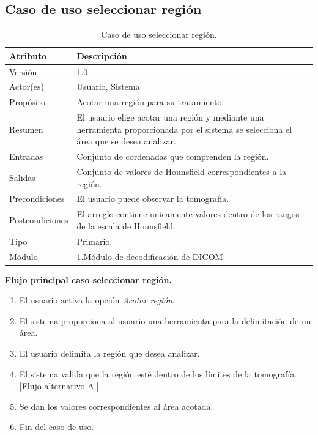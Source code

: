 \documentclass[12pt]{report}
\begin{document}
\subsection{Caso de uso seleccionar región}
\begin{table}[H]
\begin{center}
\begin{tabular}{p{30mm}p{80mm}}
\hline
Atributo & Descripción\\
\hline \hline 
Versión & 1.0\\
Actor(es) & Usuario, Sistema\\
Propósito & Acotar una región para su tratamiento.\\
Resumen & El usuario elige acotar una región y mediante una herramienta proporcionada por el sistema se selecciona el área que se desea analizar.\\
Entradas & Conjunto de cordenadas que comprenden la región.\\
Salidas & Conjunto de valores de Hounsfield correspondientes a la región.\\
Precondiciones & El usuario puede observar la tomografía.\\
Postcondiciones & El arreglo contiene unicamente valores dentro de los rangos de la escala de Hounsfield.\\
Tipo & Primario.\\ 
Módulo &  1.Módulo de decodificación de DICOM.\\
\hline \hline
\end{tabular}
\caption{Caso de uso seleccionar región.}
\end{center}
\end{table}

\textbf{Flujo principal caso seleccionar región. }
\begin{enumerate}
\item El usuario activa la opción \textit{Acotar región}.
\item El sistema proporciona al usuario una herramienta para la delimitación de un área.
\item El usuario delimita la región que desea analizar.
\item El sistema valida que la región esté dentro de los límites de la tomografía.[Flujo alternativo A.]
\item Se dan los valores correspondientes al área acotada.
\item Fin del caso de uso.
\end{enumerate}
\end{document}
